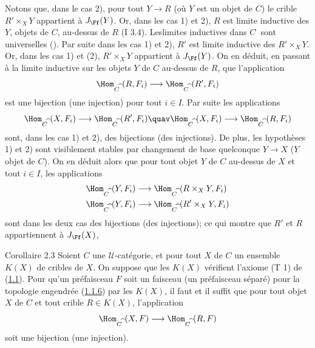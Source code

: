 Notons que, dans le cas 2), pour tout $Y\rightarrow R$ (où $Y$ est
un objet de $C$) le crible $R'\times_X Y$ appartient à $J_{\Ff}(Y)$.
Or, dans les cas 1) et 2), $R$ est limite inductive des $Y$, objets
de $C$, au-dessus de $R$ (I 3.4). Les\pageoriginale limites
inductives dans $C^{\widehat{\phantom{,}}}$ sont universelles
(). Par suite dans les cas 1) et 2), $R'$ est limite
inductive des $R'\times_X Y$. Or, dans les cas 1) et (2),
$R'\times_X Y$ appartient à $J_{\Ff}(Y)$. On en déduit, en passant à
la limite inductive sur les objets $Y$ de $C$ au-dessus de $R$, que
l'application
$$
\Hom_{C^{\widehat{\phantom{,}}}}(R,F_i)\longrightarrow
\Hom_{C^{\widehat{\phantom{,}}}}(R',F_i)
$$
est une bijection (\resp une injection) pour tout $i\in I$. Par
suite les applications
$$
\Hom_{C^{\widehat{\phantom{,}}}}(X,F_i)\longrightarrow
\Hom_{C^{\widehat{\phantom{,}}}}(R',F_i)\quav
\Hom_{C^{\widehat{\phantom{,}}}}(X,F_i)\longrightarrow
\Hom_{C^{\widehat{\phantom{,}}}}(R,F_i)
$$
sont, dans les cas 1) et 2), des bijections (\resp des injections).
De plus, les hypothèses 1) et 2) sont visiblement stables par
changement de base quelconque $Y\rightarrow X$ ($Y$ objet de $C$).
On en déduit alors que pour tout objet $Y$ de $C$ au-dessus de $X$
et tout $i\in I$, les applications
\begin{align*}
\Hom_{C^{\widehat{\phantom{,}}}}(Y,F_i)&\longrightarrow
\Hom_{C^{\widehat{\phantom{,}}}}(R\times_X Y, F_i)\\
\Hom_{C^{\widehat{\phantom{,}}}}(Y,F_i)&\longrightarrow
\Hom_{C^{\widehat{\phantom{,}}}}(R'\times_X Y, F_i)
\end{align*}
sont dans les deux cas des bijections (\resp des injections); ce qui
montre que $R'$ et $R$ appartiennent à $J_{\Ff}(X)$, \cqfd

\begin{enonce*}{Corollaire 2.3}
Soient $C$ une $𝒰$-catégorie, et pour tout $X$ de $C$ un
ensemble $K(X)$ de cribles de $X$. On suppose que les $K(X)$
vérifient l'axiome {\rm (T 1)} de {\rm(\hyperref[II.def1.1]{1.1})}. Pour
qu'un préfaisceau $F$ soit un faisceau (\resp un préfaisceau
séparé) pour la topologie engendrée (\hyperref[II.subsubsec1.1.6]{1.1.6})
par les $K(X)$, il faut et il suffit que pour tout objet $X$ de $C$
et tout crible $R\in K(X)$, l'application
$$
\Hom_{C^{\widehat{\phantom{,}}}}(X,F)\longrightarrow
\Hom_{C^{\widehat{\phantom{,}}}}(R,F)
$$
soit une bijection (\resp une injection).
\end{enonce*}

